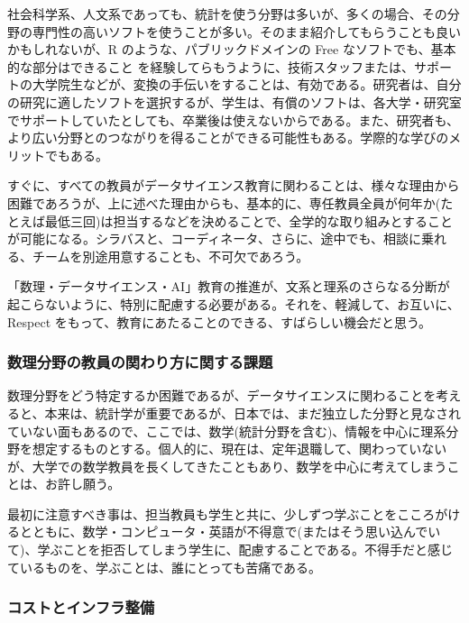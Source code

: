 \documentclass[
]{bxjsbook}
\theoremstyle{definition}
\theoremstyle{definition}
\theoremstyle{definition}
\theoremstyle{definition}
\theoremstyle{remark}
\begin{document}
社会科学系、人文系であっても、統計を使う分野は多いが、多くの場合、その分野の専門性の高いソフトを使うことが多い。そのまま紹介してもらうことも良いかもしれないが、R のような、パブリックドメインの Free なソフトでも、基本的な部分はできること を経験してらもうように、技術スタッフまたは、サポートの大学院生などが、変換の手伝いをすることは、有効である。研究者は、自分の研究に適したソフトを選択するが、学生は、有償のソフトは、各大学・研究室でサポートしていたとしても、卒業後は使えないからである。また、研究者も、より広い分野とのつながりを得ることができる可能性もある。学際的な学びのメリットでもある。

すぐに、すべての教員がデータサイエンス教育に関わることは、様々な理由から困難であろうが、上に述べた理由からも、基本的に、専任教員全員が何年か(たとえば最低三回)は担当するなどを決めることで、全学的な取り組みとすることが可能になる。シラバスと、コーディネータ、さらに、途中でも、相談に乗れる、チームを別途用意することも、不可欠であろう。

「数理・データサイエンス・AI」教育の推進が、文系と理系のさらなる分断が起こらないように、特別に配慮する必要がある。それを、軽減して、お互いに、Respect をもって、教育にあたることのできる、すばらしい機会だと思う。

\hypertarget{ux6570ux7406ux5206ux91ceux306eux6559ux54e1ux306eux95a2ux308fux308aux65b9ux306bux95a2ux3059ux308bux8ab2ux984c}{%
\subsubsection{数理分野の教員の関わり方に関する課題}\label{ux6570ux7406ux5206ux91ceux306eux6559ux54e1ux306eux95a2ux308fux308aux65b9ux306bux95a2ux3059ux308bux8ab2ux984c}}

数理分野をどう特定するか困難であるが、データサイエンスに関わることを考えると、本来は、統計学が重要であるが、日本では、まだ独立した分野と見なされていない面もあるので、ここでは、数学(統計分野を含む)、情報を中心に理系分野を想定するものとする。個人的に、現在は、定年退職して、関わっていないが、大学での数学教員を長くしてきたこともあり、数学を中心に考えてしまうことは、お許し願う。

最初に注意すべき事は、担当教員も学生と共に、少しずつ学ぶことをこころがけるとともに、数学・コンピュータ・英語が不得意で(またはそう思い込んでいて)、学ぶことを拒否してしまう学生に、配慮することである。不得手だと感じているものを、学ぶことは、誰にとっても苦痛である。

\hypertarget{ux30b3ux30b9ux30c8ux3068ux30a4ux30f3ux30d5ux30e9ux6574ux5099}{%
\subsubsection{コストとインフラ整備}\label{ux30b3ux30b9ux30c8ux3068ux30a4ux30f3ux30d5ux30e9ux6574ux5099}}
\end{document}
